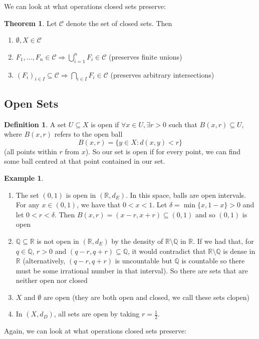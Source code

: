 \documentclass[11pt,a4paper]{article}
\theoremstyle{definition}
\newtheorem{definition}{Definition}[section]
\newtheorem{theorem}{Theorem}[section]
\newtheorem{example}{Example}[section]
\begin{document}
\noindent We can look at what operations closed sets preserve:

\begin{theorem}
    Let $\mathcal{C}$ denote the set of closed sets. Then
    \begin{enumerate}
        \item $\emptyset, X \in \mathcal{C}$
        \item $F_1,...,F_n \in \mathcal{C} \Longrightarrow \bigcup \limits _{i=1}^n F_i \in \mathcal{C}$ (preserves finite unions)
        \item $(F_i)_{i \in I} \subseteq \mathcal{C} \Longrightarrow \bigcap \limits _{i \in I}F_i \in \mathcal{C}$ (preserves arbitrary intersections)
    \end{enumerate}
\end{theorem}

\subsection*{Open Sets}

\begin{definition}
    A set $U \subseteq X$ is open if $\forall x\in U, \exists r>0$ such that $B(x,r) \subseteq U$, where $B(x,r)$ refers to the open ball \[
    B(x,r) = \{y \in X: d(x,y) < r\}
    \]
    (all points within $r$ from $x$). So our set is open if for every point, we can find some ball centred at that point contained in our set.
\end{definition}

\begin{example}
    \begin{enumerate}
    \item The set $(0,1)$ is open in $(\mathbb{R}, d_E)$. In this space, balls are open intervals. For any $x \in (0,1)$, we have that $0<x<1$. Let $\delta = \min \{x, 1-x\} > 0$ and let $0 < r < \delta$. Then $B(x,r) = (x-r, x+r) \subseteq (0,1)$ and so $(0,1)$ is open
    \item $\mathbb{Q} \subseteq \mathbb{R}$ is not open in $(\mathbb{R}, d_E)$ by the density of $\mathbb{R} \setminus \mathbb{Q}$ in $\mathbb{R}$. If we had that, for $q \in \mathbb{Q}$, $r > 0$ and $(q-r, q+r) \subseteq \mathbb{Q}$, it would contradict that $\mathbb{R} \setminus \mathbb{Q}$ is dense in $\mathbb{R}$ (alternatively, $(q-r, q+r)$ is uncountable but $\mathbb{Q}$ is countable so there must be some irrational number in that interval). So there are sets that are neither open nor closed
    \item $X$ and $\emptyset$ are open (they are both open and closed, we call these sets clopen)
    \item In $(X, d_D)$, all sets are open by taking $r = \frac{1}{2}$.
    \end{enumerate}
\end{example}
\noindent Again, we can look at what operations closed sets preserve:
\end{document}
